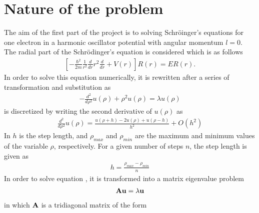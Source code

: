 \section{Nature of the problem}
\label{sec:NatureOfTheProblem}
The aim of the first part of the project is to solving Schr\"{o}inger’s equations for one electron in a harmonic oscillator potential with angular momentum $l=0$. 
The radial part of the Schr\"{o}dinger’s equation is considered which is as follows
\begin{align}
 \left[ -\frac{\hbar^2}{2 m}  \frac{1}{r^2} \frac{d}{dr} r^2
  \frac{d}{dr} + V(r) \right]R(r) 
       = E R(r).
     \label{eq:NatureOfTheProblem1}
\end{align}
In order to solve this equation numerically, it is rewritten after a series of transformation and substitution as
\begin{align}
	-\frac{d^2}{d\rho^2} u(\rho) + \rho^2u(\rho)  = \lambda u(\rho)
	\label{eq:NatureOfTheProblem2}
\end{align}
 is discretized by writing the second derivative of $u(\rho)$ as 
\begin{align}
	\frac{d^2}{d\rho^2} u(\rho) =\frac{u(\rho+h) -2u(\rho) +u(\rho-h)}{h^2} +O(h^2)
	\label{eq:NatureOfTheProblem3}
\end{align}   
In  $h$ is the step length, and $\rho_{max}$ and $\rho_{min}$ are the maximum and minimum values of the variable $\rho$, respectively. 
For a given number of steps $n$, the step length is given as
\begin{align}
	h=\frac{\rho_{{max}}-\rho_{{min}} }{n}
	\label{eq:NatureOfTheProblem4}
\end{align}
In order to solve equation , it is transformed into a matrix eigenvalue problem 
\begin{align}
	\mbox{\textbf{A}} \mbox{\textbf{u}} = \lambda \mbox{\textbf{u}}
	\label{eq:NatureOfTheProblem5}
\end{align}
in which $\mbox{\textbf{A}}$ is a tridiagonal matrix of the form
